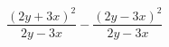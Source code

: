 \begin{ex}[type=expression]
	\begin{condition}
		\(\dfrac{(2y+3x)^2}{2y-3x}-\dfrac{(2y-3x)^2}{2y-3x}\)
	\end{condition}
\end{ex}